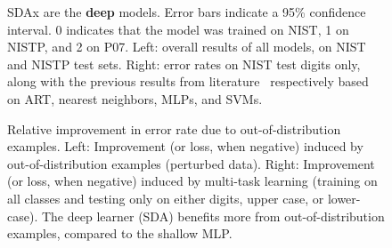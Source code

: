 \documentclass{article} %
\begin{document}
\begin{figure}[ht]
\centerline{}
\caption{SDAx are the {\bf deep} models. Error bars indicate a 95\% confidence interval. 0 indicates that the model was trained
on NIST, 1 on NISTP, and 2 on P07. Left: overall results
of all models, on NIST and NISTP test sets.
Right: error rates on NIST test digits only, along with the previous results from 
literature~\citep{Granger+al-2007,Cortes+al-2000,Oliveira+al-2002-short,Milgram+al-2005}
respectively based on ART, nearest neighbors, MLPs, and SVMs.}
\label{fig:error-rates-charts}
\end{figure}


\begin{figure}[ht]
\vspace*{-3mm}
\centerline{}
\vspace*{-3mm}
\caption{Relative improvement in error rate due to out-of-distribution examples.
Left: Improvement (or loss, when negative)
induced by out-of-distribution examples (perturbed data). 
Right: Improvement (or loss, when negative) induced by multi-task 
learning (training on all classes and testing only on either digits,
upper case, or lower-case). The deep learner (SDA) benefits more from
out-of-distribution examples, compared to the shallow MLP.}
\label{fig:improvements-charts}
\vspace*{-2mm}
\end{figure}
\end{document}

